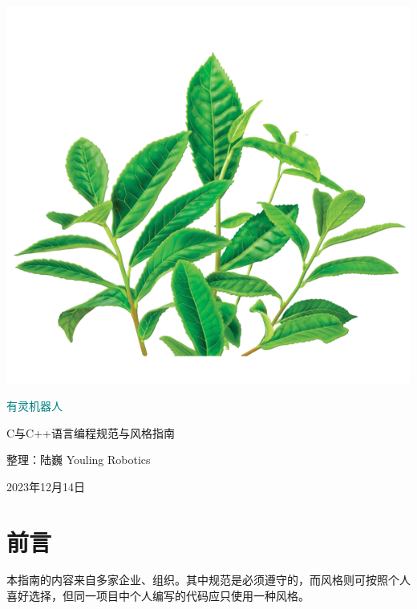 \documentclass[oneside,fontset=founder]{ctexbook}
\begin{document}
\begin{titlepage}%
\begin{center}
  \quad

  \vspace{2ex}

  \includegraphics[width=.4\textwidth]{images/cover.png}

  \vspace{4ex}

  \Huge\heiti\textcolor{teal}{有灵机器人}

  \vspace{2ex}

  C与C++语言编程规范与风格指南\normalsize\normalfont

  \vspace{4ex}

  整理：陆巍
  \vfill%
  Youling Robotics

  2023年12月14日
\end{center}
\end{titlepage}


\frontmatter%


\chapter{前言}
本指南的内容来自多家企业、组织。其中规范是必须遵守的，而风格则可按照个人喜好选择，但同一项目中个人编写的代码应只使用一种风格。


\tableofcontents%


\mainmatter


\end{document}
